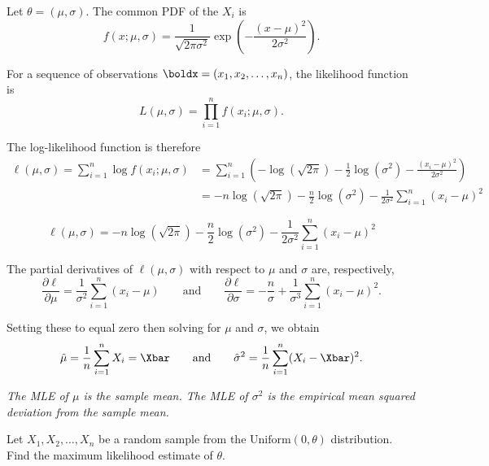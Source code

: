 \begin{solution}
Let $\theta=(\mu,\sigma)$. The common PDF of the $X_i$ is
\[
f(x;\mu,\sigma) = \frac{1}{\sqrt{2\pi\sigma^2}}\exp\left(-\frac{(x-\mu)^2}{2\sigma^2}\right).
\]

For a sequence of observations $\boldx=(x_1,x_2,\ldots,x_n)$, the likelihood function is \[
\displaystyle L(\mu,\sigma) 
	= \prod_{i=1}^n f(x_i;\mu,\sigma).
\]

The log-likelihood function is therefore
\begin{align*}
\ell(\mu,\sigma) = \sum_{i=1}^n \log f(x_i;\mu,\sigma)
	& = \sum_{i=1}^n \left( -\log(\sqrt{2\pi}) - \frac{1}{2}\log(\sigma^2) - \frac{(x_i-\mu)^2}{2\sigma^2}\right) \\
	& = -n\log(\sqrt{2\pi}) - \frac{n}{2}\log(\sigma^2) - \frac{1}{2\sigma^2}\sum_{i=1}^n (x_i-\mu)^2
\end{align*}



\[
\ell(\mu,\sigma) = -n\log(\sqrt{2\pi}) - \frac{n}{2}\log(\sigma^2) - \frac{1}{2\sigma^2}\sum_{i=1}^n (x_i-\mu)^2
\]

The partial derivatives of $\ell(\mu,\sigma)$ with respect to $\mu$ and $\sigma$ are, respectively,
\[
\frac{\partial\ell}{\partial\mu} = \frac{1}{\sigma^2}\sum_{i=1}^n(x_i-\mu)
\qquad\text{and}\qquad
\frac{\partial\ell}{\partial\sigma} = -\frac{n}{\sigma} + \frac{1}{\sigma^3}\sum_{i=1}^n(x_i-\mu)^2.
\]

Setting these to equal zero then solving for $\mu$ and $\sigma$, we obtain
\[
\hat{\mu} = \frac{1}{n}\sum_{i=1}^n X_i = \Xbar
\qquad\text{and}\qquad
\hat{\sigma}^2 = \frac{1}{n}\sum_{i=1}^n (X_i-\Xbar)^2.
\]

\bit
\it The MLE of $\mu$ is the \emph{sample mean}.
\it The MLE of $\sigma^2$ is the \emph{empirical mean squared deviation from the sample mean}.
\eit
\end{solution}

\begin{example}\label{ex:mleuniform}
Let $X_1,X_2,\ldots,X_n$ be a random sample from the $\text{Uniform}(0,\theta)$ distribution. Find the maximum likelihood estimate of $\theta$.
\end{example}

